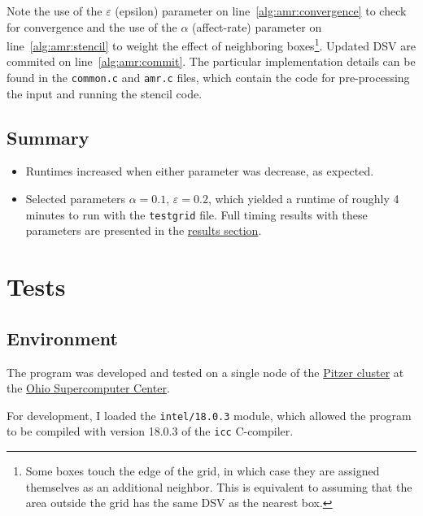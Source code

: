 \documentclass{article}
\begin{document}
Note the use of the $\varepsilon$ (epsilon) parameter on
line~\ref{alg:amr:convergence} to check for convergence and the use of the
$\alpha$ (affect-rate) parameter on line~\ref{alg:amr:stencil} to weight the
effect of neighboring boxes\footnote{Some boxes touch the edge of the grid, in
which case they are assigned themselves as an additional neighbor. This is
equivalent to assuming that the area outside the grid has the same DSV as the
nearest box.}.  Updated DSV are commited on line~\ref{alg:amr:commit}. The
particular implementation details can be found in the \texttt{common.c} and
\texttt{amr.c} files, which contain the code for pre-processing the input and
running the stencil code.

\subsection*{Summary}
\label{subsec:summary}

\begin{itemize}

    \item Runtimes increased when either parameter was decrease, as expected.

    \item Selected parameters $\alpha=0.1$, $\varepsilon=0.2$, which yielded a
    runtime of roughly 4 minutes to run with the
    \texttt{testgrid} file. Full timing
    results with these parameters are presented in the
    \hyperref[sec:results]{results section}.

\end{itemize}

\newpage
\section*{Tests}
\label{sec:tests}

\subsection*{Environment}
\label{subsec:environment}

The program was developed and tested on a single node of the
\href{https://www.osc.edu/resources/technical_support/supercomputers/pitzer}{Pitzer
cluster} at the \href{https://www.osc.edu/}{Ohio Supercomputer Center}.

For development, I loaded the \texttt{intel/18.0.3} module, which allowed the
program to be compiled with version 18.0.3 of the \texttt{icc} C-compiler.
\end{document}
